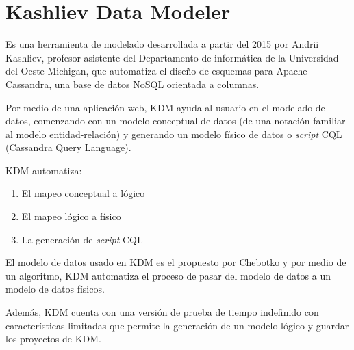 \section{Kashliev Data Modeler}
Es una herramienta de modelado desarrollada a partir del 2015 por Andrii Kashliev, profesor asistente del Departamento de informática de la Universidad del Oeste Michigan, que automatiza el diseño de esquemas para Apache Cassandra, una base de datos NoSQL orientada a columnas. 


Por medio de una aplicación web, KDM ayuda al usuario en el modelado de datos, comenzando con un modelo conceptual de datos (de una notación familiar al modelo entidad-relación) y generando un modelo físico de datos o \textit{script} CQL (Cassandra Query Language). 


KDM automatiza: 

\begin{enumerate}
    \item El mapeo conceptual a lógico
    \item El mapeo lógico a físico
    \item La generación de \textit{script} CQL 
\end{enumerate}

El modelo de datos usado en KDM es el propuesto por Chebotko\cite{chebotko_big_2015} y por medio de un algoritmo, KDM automatiza el proceso de pasar del modelo de datos a un modelo de datos físicos. 


Además, KDM cuenta con una versión de prueba de tiempo indefinido con características limitadas que permite la generación de un modelo lógico y guardar los proyectos de KDM.

